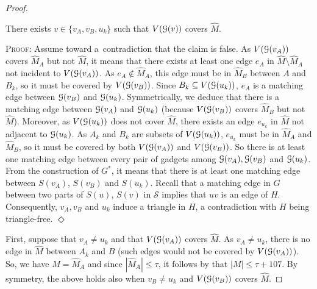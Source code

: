 \documentclass[a4paper,UKenglish,cleveref,hyperref,autoref]{lipics-v2021}
\renewcommand{\leq}{\leqslant}
\newenvironment{proofofclaim}{\noindent \textsc{Proof:}}{\hfill$\Diamond$\medskip}
\begin{document}
\begin{proof}
	\begin{claim}
		There exists $v \in \{v_A,v_B,u_k\}$ such that $V(\mathcal G(v))$ covers $\widehat M$.
	\end{claim}
	\begin{proofofclaim}
		Assume toward a~contradiction that the claim is false.
		As $V(\mathcal G(v_A))$ covers $\widehat M_A$ but not $\widehat M$, it means that there exists at least one edge $e_A$ in $\widehat M\setminus \widehat M_A$ not incident to $V(\mathcal G(v_A))$.
		As $e_A \notin \widehat M_A$, this edge must be in $\widehat M_B$ between $A$ and $B_k$, so it must be covered by $V(\mathcal G(v_B))$. 
		Since $B_k\subseteq V(\mathcal G(u_k))$, $e_A$ is a matching edge between $\mathcal G(v_B)$ and $\mathcal G(u_k)$.
		Symmetrically, we deduce that there is a matching edge between $\mathcal G(v_A)$ and $\mathcal G(u_k)$ (because $V(\mathcal G(v_B))$ covers $\widehat M_B$ but not $\widehat M$).
		Moreover, as $V(\mathcal G(u_k))$ does not cover $\widehat M$, there exists an edge $e_{u_k}$ in $\widehat M$ not adjacent to $\mathcal G(u_k)$.
		As $A_k$ and $B_k$ are subsets of $V(\mathcal G(u_k))$, $e_{u_k}$ must be in $\widehat M_A$ and $\widehat M_B$, so it must be covered by both $V(\mathcal G(v_A))$ and $V(\mathcal G(v_B))$.
		So there is at least one matching edge between every pair of gadgets among $\mathcal G(v_A), \mathcal G(v_B)$ and $\mathcal G(u_k)$.
		From the construction of $G^*$, it means that there is at least one matching edge between $S(v_A)$, $S(v_B)$ and $S(u_k)$.
		Recall that a matching edge in $G$ between two parts of $S(u)$, $S(v)$ in $\mathcal S$ implies that $uv$ is an edge of $H$.
		Consequently, $v_A, v_B$ and $u_k$ induce a triangle in $H$, a contradiction with $H$ being triangle-free.
	\end{proofofclaim}
	
	First, suppose that $v_A\neq u_k$ and that $V(\mathcal G(v_A))$ covers $\widehat M$.
	As $v_A\neq u_k$, there is no edge in $\widehat M$ between $A_k$ and $B$ (such edges would not be covered by $V(\mathcal G(v_A))$).
	So, we have $\widehat M = \widehat M_A$ and since $|\widehat M_A| \leq \tau$, it follows by  that $|M| \leq \tau + 107$.
	By symmetry, the above holds also when $v_B\neq u_k$ and  $V(\mathcal G(v_B))$ covers $\widehat M$.
	

\end{proof}
\end{document}
